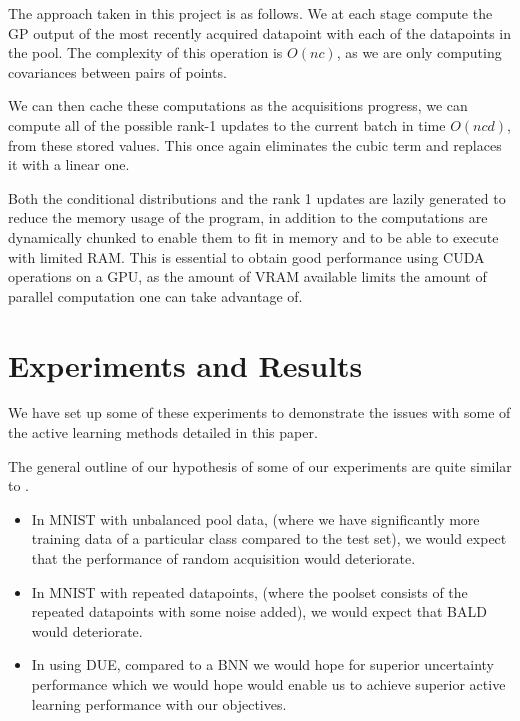 \documentclass[12pt, a4paper]{report}
\theoremstyle{definition}
\theoremstyle{definition}
\theoremstyle{definition}
\begin{document}
The approach taken in this project is as follows. We at each stage compute the GP output of the most recently acquired datapoint with each of the datapoints in the pool. The complexity of this operation is $O(nc)$, as we are only computing covariances between pairs of points.

We can then cache these computations as the acquisitions progress, we can compute all of the possible rank-1 updates to the current batch in time $O(ncd)$, from these stored values. This once again eliminates the cubic term and replaces it with a linear one.


Both the conditional distributions and the rank 1 updates are lazily generated to reduce the memory usage of the program, in addition to the computations are dynamically chunked to enable them to fit in memory and to be able to execute with limited RAM. This is essential to obtain good performance using CUDA operations on a GPU, as the amount of VRAM available limits the amount of parallel computation one can take advantage of.



\chapter{Experiments and Results}
\label{sec:Experiments}

We have set up some of these experiments to demonstrate the issues with some of the active learning methods detailed in this paper.

The general outline of our hypothesis of some of our experiments are quite similar to \cite{kirsch2019batchbald}.

\begin{itemize}
    \item In MNIST with unbalanced pool data, (where we have significantly more training data of a particular class compared to the test set), we would expect that the performance of random acquisition would deteriorate.
    \item In MNIST with repeated datapoints, (where the poolset consists of the repeated datapoints with some noise added), we would expect that BALD would deteriorate.
\end{itemize}


\begin{itemize}
    \item In using DUE, compared to a BNN we would hope for superior uncertainty performance which we would hope would enable us to achieve superior active learning performance with our objectives.
\end{itemize}
\end{document}
